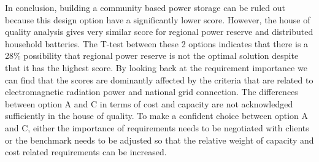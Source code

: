 \documentclass{article}
\begin{document}
In conclusion, building a community based power storage can be ruled out because this design option have a significantly lower score. However, the house of quality analysis gives very similar score for regional power reserve and distributed household batteries. The T-test between these 2 options indicates that there is a 28\% possibility that regional power reserve is not the optimal solution despite that it has the highest score. By looking back at the requirement importance we can find that the scores are dominantly affected by the criteria that are related to electromagnetic radiation power and national grid connection. The differences between option A and C in terms of cost and capacity are not acknowledged sufficiently in the house of quality. To make a confident choice between option A and C, either the importance of requirements needs to be negotiated with clients or the benchmark needs to be adjusted so that the relative weight of capacity and cost related requirements can be increased.
\end{document}
